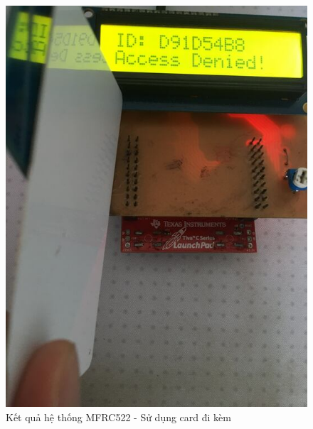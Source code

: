 \begin{figure}[ht]
\centering
\includegraphics[scale=0.3]{images/mfrc522_card.jpg}
\caption{Kết quả hệ thống MFRC522 - Sử dụng card đi kèm}
\label{fig:rc522_card}
\end{figure}


